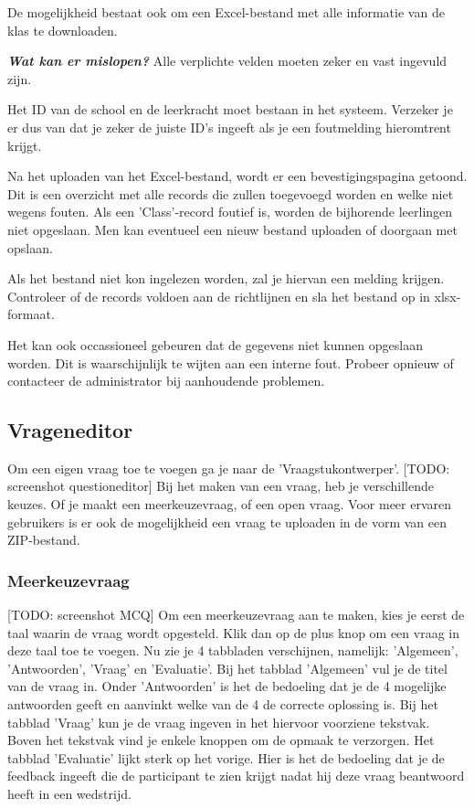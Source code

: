 \documentclass[]{article}
\begin{document}
De mogelijkheid bestaat ook om een Excel-bestand met alle informatie van de klas te downloaden.

\textbf{\textit{Wat kan er mislopen?}}
Alle verplichte velden moeten zeker en vast ingevuld zijn.

Het ID van de school en de leerkracht moet bestaan in het systeem. Verzeker je er dus van dat je zeker de juiste ID's ingeeft als je een foutmelding hieromtrent krijgt.

Na het uploaden van het Excel-bestand, wordt er een bevestigingspagina getoond. Dit is een overzicht met alle records die zullen toegevoegd worden en welke niet wegens fouten. Als een 'Class'-record foutief is, worden de bijhorende leerlingen niet opgeslaan. Men kan eventueel een nieuw bestand uploaden of doorgaan met opslaan.

Als het bestand niet kon ingelezen worden, zal je hiervan een melding krijgen. Controleer of de records voldoen aan de richtlijnen en sla het bestand op in xlsx-formaat.

Het kan ook occassioneel gebeuren dat de gegevens niet kunnen opgeslaan worden. Dit is waarschijnlijk te wijten aan een interne fout. Probeer opnieuw of contacteer de administrator bij aanhoudende problemen. 

\subsection{Vrageneditor}

Om een eigen vraag toe te voegen ga je naar de 'Vraagstukontwerper'. [TODO: screenshot questioneditor] Bij het maken van een vraag, heb je verschillende keuzes. Of je maakt een meerkeuzevraag, of een open vraag. Voor meer ervaren gebruikers is er ook de mogelijkheid een vraag te uploaden in de vorm van een ZIP-bestand.

\subsubsection{Meerkeuzevraag}

[TODO: screenshot MCQ] Om een meerkeuzevraag aan te maken, kies je eerst de taal waarin de vraag wordt opgesteld. Klik dan op de plus knop om een vraag in deze taal toe te voegen. Nu zie je 4 tabbladen verschijnen, namelijk: 'Algemeen', 'Antwoorden', 'Vraag' en 'Evaluatie'. Bij het tabblad 'Algemeen' vul je de titel van de vraag in. Onder 'Antwoorden' is het de bedoeling dat je de 4 mogelijke antwoorden geeft en aanvinkt welke van de 4 de correcte oplossing is. Bij het tabblad 'Vraag' kun je de vraag ingeven in het hiervoor voorziene tekstvak. Boven het tekstvak vind je enkele knoppen om de opmaak te verzorgen. Het tabblad 'Evaluatie' lijkt sterk op het vorige. Hier is het de bedoeling dat je de feedback ingeeft die de participant te zien krijgt nadat hij deze vraag beantwoord heeft in een wedstrijd. 
\end{document}
